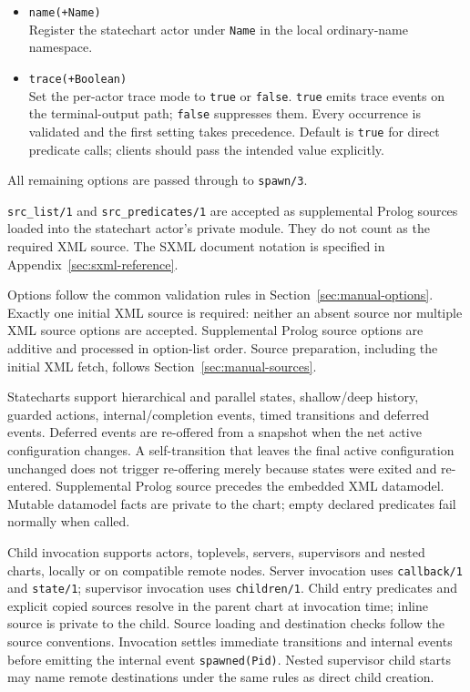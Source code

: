\begin{itemize}
\item
  \texttt{name(\allowbreak{}+Name)}\\
  Register the statechart actor under \texttt{Name} in the local ordinary-name
  namespace.
\item
  \texttt{trace(\allowbreak{}+Boolean)}\\
  Set the per-actor trace mode to \texttt{true} or \texttt{false}.
  \texttt{true} emits trace events on the terminal-output path;
  \texttt{false} suppresses them. Every occurrence is validated and the first
  setting takes precedence. Default is \texttt{true} for direct predicate calls; clients
  should pass the intended value explicitly.
\end{itemize}

\noindent All remaining options are passed through to \texttt{spawn/\allowbreak{}3}.

\medskip
\noindent \texttt{src\_\allowbreak{}list/\allowbreak{}1} and \texttt{src\_\allowbreak{}predicates/\allowbreak{}1} are accepted as
supplemental Prolog sources loaded into the statechart actor's private module.
They do not count as the required XML source. The SXML document notation is
specified in Appendix~\ref{sec:sxml-reference}.

Options follow the common validation rules in Section~\ref{sec:manual-options}.
Exactly one initial XML source is required: neither an absent source nor multiple
XML source options are accepted. Supplemental Prolog source options are additive
and processed in option-list order. Source preparation, including the initial XML
fetch, follows Section~\ref{sec:manual-sources}.

Statecharts support hierarchical and parallel states, shallow/deep history, guarded actions,
internal/completion events, timed transitions and deferred events. Deferred events are re-offered
from a snapshot when the net active configuration changes. A self-transition that leaves the final
active configuration unchanged does not trigger re-offering merely because states were exited and
re-entered. Supplemental Prolog source precedes the embedded XML datamodel. Mutable datamodel facts
are private to the chart; empty declared predicates fail normally when called.

Child invocation supports actors, toplevels, servers, supervisors and nested charts, locally or on
compatible remote nodes. Server invocation uses \texttt{callback/\allowbreak{}1} and \texttt{state/\allowbreak{}1}; supervisor
invocation uses \texttt{children/\allowbreak{}1}. Child entry predicates and explicit copied sources resolve in
the parent chart at invocation time; inline source is private to the child. Source loading and
destination checks follow the source conventions. Invocation settles immediate
transitions and internal events before emitting the internal event
\texttt{spawned(Pid)}. Nested supervisor child starts may name remote
destinations under the same rules as direct child creation.

